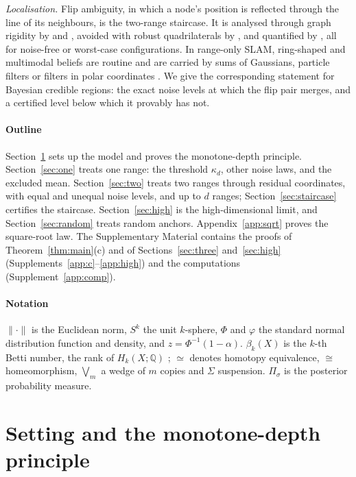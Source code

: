 \emph{Localisation.} Flip ambiguity, in which a node's position is reflected through the line of its neighbours, is the
two-range staircase. It is analysed through graph rigidity by \citet{eren2004} and \citet{aspnes2006}, avoided with robust
quadrilaterals by \citet{moore2004}, and quantified by \citet{kannan2010}, all for noise-free or worst-case
configurations. In range-only SLAM, ring-shaped and multimodal beliefs are routine and are carried by sums of Gaussians,
particle filters or filters in polar coordinates \citep{blanco2008,djugash2012}. We give the corresponding statement for
Bayesian credible regions: the exact noise levels at which the
flip pair merges, and a certified level below which it provably has not.

\paragraph{Outline} Section~\ref{sec:setting} sets up the model and proves the monotone-depth principle.
Section~\ref{sec:one} treats one range: the threshold $\kappa_d$, other noise laws, and the excluded mean.
Section~\ref{sec:two} treats two ranges through residual coordinates, with equal and unequal noise levels, and up to
$d$ ranges; Section~\ref{sec:staircase} certifies the staircase. Section~\ref{sec:high} is the high-dimensional limit,
and Section~\ref{sec:random} treats random anchors. Appendix~\ref{app:sqrt} proves the square-root law. The
Supplementary Material contains the proofs of Theorem~\ref{thm:main}(c) and of Sections~\ref{sec:three}
and~\ref{sec:high} (Supplements~\ref{app:c}--\ref{app:high}) and the computations (Supplement~\ref{app:comp}).

\paragraph{Notation} $\|\cdot\|$ is the Euclidean norm, $S^k$ the unit $k$-sphere, $\Phi$ and $\varphi$ the standard
normal distribution function and density, and $z = \Phi^{-1}(1-\alpha)$. $\beta_k(X)$ is the $k$-th Betti number, the
rank of $H_k(X;\mathbb Q)$ \citep{hatcher2002}; $\simeq$ denotes homotopy equivalence, $\cong$ homeomorphism,
$\bigvee_m$ a wedge of $m$ copies and $\Sigma$ suspension. $\Pi_\sigma$ is the posterior probability measure.

\section{Setting and the monotone-depth principle}\label{sec:setting}


